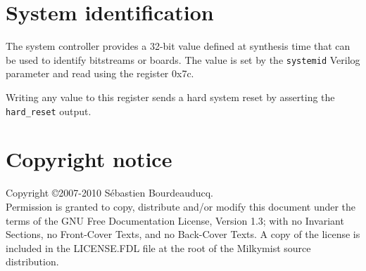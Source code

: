 \documentclass[a4paper,11pt]{article}
\begin{document}
\section{System identification}
The system controller provides a 32-bit value defined at synthesis time that can be used to identify bitstreams or boards. The value is set by the \verb!systemid! Verilog parameter and read using the register 0x7c.

Writing any value to this register sends a hard system reset by asserting the \verb!hard_reset! output.

\section*{Copyright notice}
Copyright \copyright 2007-2010 S\'ebastien Bourdeauducq. \\
Permission is granted to copy, distribute and/or modify this document under the terms of the GNU Free Documentation License, Version 1.3; with no Invariant Sections, no Front-Cover Texts, and no Back-Cover Texts. A copy of the license is included in the LICENSE.FDL file at the root of the Milkymist source distribution.
\end{document}
